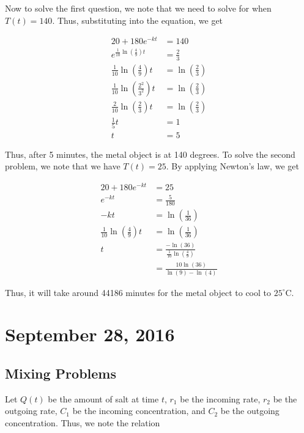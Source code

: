 \documentclass[11pt]{article}
\theoremstyle{plain} %
\theoremstyle{definition}
\theoremstyle{example}
\theoremstyle{remark}
\begin{document}
Now to solve the first question, we note that we need to solve for when $T(t) = 140$. Thus, substituting into the equation, we get 

\begin{align*}
	20+180e^{-kt} &= 140\\
	e^{\frac{1}{10}\ln\left(\frac{4}{9}\right)t} &= \frac{2}{3}\\
	\frac{1}{10}\ln\left(\frac{4}{9}\right) t&= \ln\left(\frac{2}{3}\right)\\
	\frac{1}{10}\ln\left(\frac{2^2}{3^2}\right)t &=  \ln\left(\frac{2}{3}\right)\\
	\frac{2}{10}\ln\left(\frac{2}{3}\right) t &=  \ln\left(\frac{2}{3}\right)\\
	\frac{1}{5}t &=1\\
	t &= 5
\end{align*}

Thus, after 5 minutes, the metal object is at 140 degrees. To solve the second problem, we note that  we have $T(t) = 25$. By applying Newton's law, we get

\begin{align*}
20 + 180e^{-kt} &= 25\\
e^{-kt} &= \frac{5}{180}\\
-kt &= \ln\left(\frac{1}{36}\right)\\
\frac{1}{10}\ln\left(\frac{4}{9}\right)t &= \ln\left(\frac{1}{36}\right)\\
t &= \frac{-\ln(36)}{\frac{1}{10}\ln\left(\frac{4}{9}\right)}\\
&= \frac{10\ln(36)}{\ln(9)-\ln(4)}
\end{align*}

Thus, it will take around 44186 minutes for the metal object to cool to $25^{\circ}\mathrm C$. 






\section{September 28, 2016}
\subsection{Mixing Problems}


Let $Q(t)$ be the amount of salt at time $t$, $r_1$ be the incoming rate, $r_2$ be the outgoing rate, $C_1$ be the incoming concentration, and $C_2$ be the outgoing concentration. Thus, we note the relation 
\end{document}
